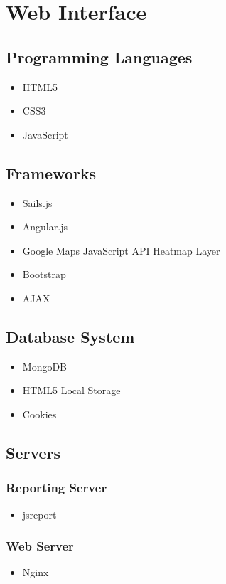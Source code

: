 \documentclass[11pt,fleqn]{book} %
\begin{document}
	\section{Web Interface}
	\subsection{Programming Languages}
	\begin{itemize}
		\item HTML5
		\item CSS3
		\item JavaScript
	\end{itemize}
	\subsection{Frameworks}
	\begin{itemize}
		\item Sails.js
		\item Angular.js
		\item Google Maps JavaScript API Heatmap Layer
		\item Bootstrap
		\item AJAX
	\end{itemize}
	\subsection{Database System}
	\begin{itemize}
		\item MongoDB
		\item HTML5 Local Storage
		\item Cookies				
	\end{itemize}
	\subsection{Servers}
	\subsubsection{Reporting Server}
	\begin{itemize}
		\item jsreport				
	\end{itemize}
	\subsubsection{Web Server}
	\begin{itemize}
		\item Nginx				
	\end{itemize}
\end{document}
